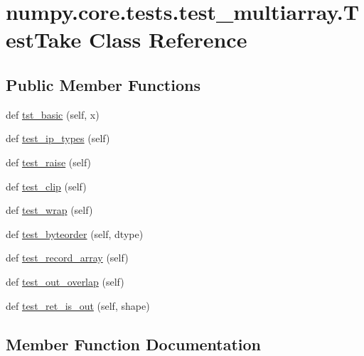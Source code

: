 \hypertarget{classnumpy_1_1core_1_1tests_1_1test__multiarray_1_1TestTake}{}\section{numpy.\+core.\+tests.\+test\+\_\+multiarray.\+Test\+Take Class Reference}
\label{classnumpy_1_1core_1_1tests_1_1test__multiarray_1_1TestTake}
\subsection*{Public Member Functions}
\begin{DoxyCompactItemize}
\item 
def \hyperlink{classnumpy_1_1core_1_1tests_1_1test__multiarray_1_1TestTake_a599b059ef52eab32b58af7872f79ef41}{tst\+\_\+basic} (self, x)
\item 
def \hyperlink{classnumpy_1_1core_1_1tests_1_1test__multiarray_1_1TestTake_a32a6722f8c221aa5cd5d252d6b47e7f5}{test\+\_\+ip\+\_\+types} (self)
\item 
def \hyperlink{classnumpy_1_1core_1_1tests_1_1test__multiarray_1_1TestTake_ac2d7ee66d4c49b1453b32c236de4aae6}{test\+\_\+raise} (self)
\item 
def \hyperlink{classnumpy_1_1core_1_1tests_1_1test__multiarray_1_1TestTake_a9d0ee7fa6d50b035262f1f7af96f2d72}{test\+\_\+clip} (self)
\item 
def \hyperlink{classnumpy_1_1core_1_1tests_1_1test__multiarray_1_1TestTake_acad073e9a9ce5444f06959ae732cbd3b}{test\+\_\+wrap} (self)
\item 
def \hyperlink{classnumpy_1_1core_1_1tests_1_1test__multiarray_1_1TestTake_a5b43eb8dc0118ee6f1d817de03c3dda1}{test\+\_\+byteorder} (self, dtype)
\item 
def \hyperlink{classnumpy_1_1core_1_1tests_1_1test__multiarray_1_1TestTake_a53211d0202b9763de795c4d742dd6b4b}{test\+\_\+record\+\_\+array} (self)
\item 
def \hyperlink{classnumpy_1_1core_1_1tests_1_1test__multiarray_1_1TestTake_a3392258f629b4ca6991560761c0f62bb}{test\+\_\+out\+\_\+overlap} (self)
\item 
def \hyperlink{classnumpy_1_1core_1_1tests_1_1test__multiarray_1_1TestTake_a7425fbd941c54c7138f3b6c737332e15}{test\+\_\+ret\+\_\+is\+\_\+out} (self, shape)
\end{DoxyCompactItemize}


\subsection{Member Function Documentation}
\mbox{\label{classnumpy_1_1core_1_1tests_1_1test__multiarray_1_1TestTake_a5b43eb8dc0118ee6f1d817de03c3dda1}} 

